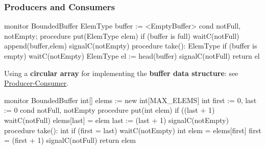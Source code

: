 \subsubsection{Producers and Consumers}\label{sub:pi_mn_producers_and_consumers} %
\begin{codeblock}{}
    monitor BoundedBuffer {
        ElemType buffer := <EmptyBuffer>
        cond notFull, notEmpty;
        procedure put(ElemType elem){
            if (buffer is full)
            waitC(notFull)
            append(buffer,elem)
            signalC(notEmpty)
        }
        procedure take(): ElemType {
            if (buffer is empty)
            waitC(notEmpty)
            ElemType el := head(buffer)
            signalC(notFull)
            return el
        }
    }
\end{codeblock}
\begin{remark}{}{}
    Using a \textbf{circular array} for implementing the \textbf{buffer data structure}: see \hyperref[sub:cp_producer_consumer_p_c_problem]{Producer-Consumer}.
    \begin{codeblock}{}
    monitor BoundedBuffer {
        int[] elems := new int[MAX_ELEMS]
        int first := 0, last := 0
        cond notFull, notEmpty
        procedure put(int elem){
            if ((last + 1) %
            waitC(notFull)
            elems[last] = elem
            last := (last + 1) %
            signalC(notEmpty)
        }
        procedure take(): int {
            if (first = last)
            waitC(notEmpty)
            int elem = elems[first]
            first = (first + 1) %
            signalC(notFull)
            return elem
        }
    }
    \end{codeblock}
\end{remark}
%
